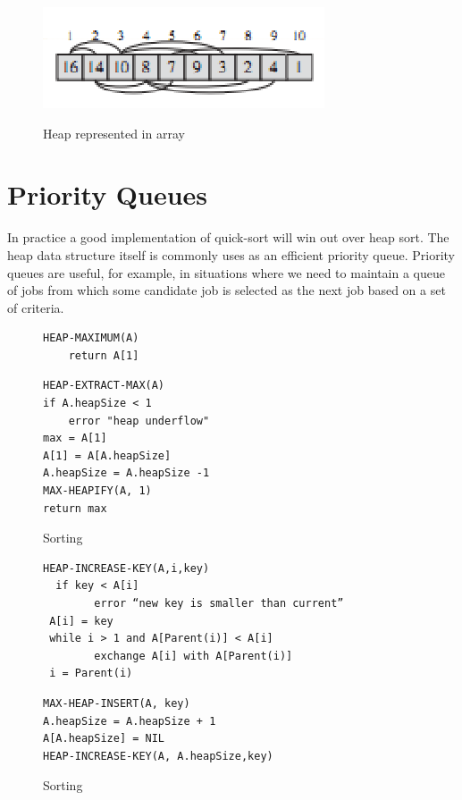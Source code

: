 \documentclass[10pt,a4paper]{article}
\begin{document}
\begin{figure}
\caption{Heap represented in array\cite{INTROALG}}
\begin{center}
\includegraphics[scale=0.43]{../images/heaparray.png}
\label{heapsortalg}
\end{center}
\end{figure}


\section{Priority Queues}
In practice a good implementation of quick-sort will win out over heap sort. The heap data structure itself is commonly uses as an efficient priority queue. Priority queues are useful, for example, in situations where we need to maintain a queue of jobs from which some candidate job is selected as the next job based on a set of criteria. 

\begin{figure}
\caption{Sorting}
\begin{center}

\begin{lstlisting}
HEAP-MAXIMUM(A)
	return A[1]
\end{lstlisting}

\begin{lstlisting}
HEAP-EXTRACT-MAX(A)
if A.heapSize < 1 
	error "heap underflow"
max = A[1]
A[1] = A[A.heapSize]
A.heapSize = A.heapSize -1 
MAX-HEAPIFY(A, 1)
return max
\end{lstlisting}


\label{heapsort}
\end{center}
\end{figure}





\begin{figure}
\caption{Sorting}
\begin{center}

\begin{lstlisting}
HEAP-INCREASE-KEY(A,i,key)
  if key < A[i]
        error “new key is smaller than current”
 A[i] = key
 while i > 1 and A[Parent(i)] < A[i]
        exchange A[i] with A[Parent(i)]
 i = Parent(i)
\end{lstlisting}

\begin{lstlisting}
MAX-HEAP-INSERT(A, key)
A.heapSize = A.heapSize + 1
A[A.heapSize] = NIL
HEAP‐INCREASE‐KEY(A, A.heapSize,key)
\end{lstlisting}


\label{heapsort}
\end{center}
\end{figure}
\end{document}
